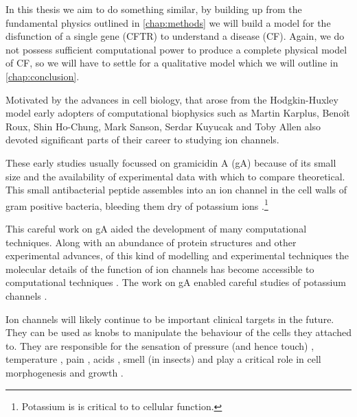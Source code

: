 In this thesis we aim to do something similar, by building up from the fundamental physics outlined in \ref{chap:methods} we will build a model for the disfunction of a single gene (CFTR) to understand a disease (CF). Again, we do not possess sufficient computational power to produce a complete physical model of CF, so we will have to settle for a qualitative model which we will outline in \ref{chap:conclusion}. 

Motivated by the advances in cell biology, that arose from the Hodgkin-Huxley model early adopters of computational biophysics such as Martin Karplus, Beno\^it Roux, Shin Ho-Chung, Mark Sanson, Serdar Kuyucak and Toby Allen also devoted significant parts of their career to studying ion channels\cite{sansom1991, roux1991, roux1993, sansom1991, allen2003, allen2004, chung2002, tieleman2001}. 

These early studies usually focussed on gramicidin A (gA) because of its small size and the availability of experimental data with which to compare theoretical. This small antibacterial peptide assembles into an ion channel in the cell walls of gram positive bacteria, bleeding them dry of potassium ions \cite{liou2015}.\footnote{Potassium is is critical to to cellular function.}

This careful work on gA aided the development of many computational techniques. Along with an abundance of protein structures and other experimental advances, of this kind of modelling and experimental techniques the molecular details of the function of ion channels has become accessible to computational techniques \cite{flood2019}. The work on gA enabled careful studies of potassium channels \cite{rashid2013, li2021, vandenberg2021}. 

Ion channels will likely continue to be important clinical targets in the future. They can be used as knobs to manipulate the behaviour of the cells they attached to. They are responsible for the sensation of pressure (and hence touch) \cite{chesler2018}, temperature \cite{castillo2018}, pain \cite{kingwell2019}, acids \cite{kweon2013}, smell (in insects) \cite{sato2008} and play a critical role in cell morphogenesis and growth \cite{lang2005, sundelacruz2009, levin2014, levin2014a}.

